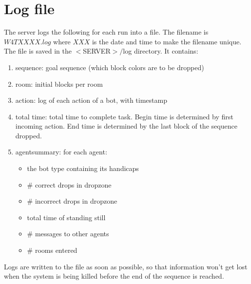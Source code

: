 \documentclass[11pt,a4paper]{article}
\begin{document}
\section{Log file}
The server logs the following for each run into a file. The filename is $W4TXXXX.log$ where $XXX$ is the date and time to make the filename unique. The file is saved in the $<$SERVER$>/$log directory. It contains:
\begin{enumerate}
\item sequence: goal sequence (which block colors are to be dropped)
\item room: initial blocks per room
\item action: log of each action of a bot, with timestamp 
\item total time: total time to complete task. Begin time is determined by first incoming action. End time is determined by the last block of the sequence dropped.
\item agentsummary: for each agent:
    \begin{itemize}
    \item the bot type containing its handicaps
    \item \# correct drops in dropzone
    \item \# incorrect drops in dropzone
    \item total time of standing still
    \item \# messages to other agents
    \item \# rooms entered
    \end{itemize}
\end{enumerate}
Logs are written to the file as soon as possible, so that information won't get lost when the system is being killed before the end of the sequence is reached.




\end{document}
